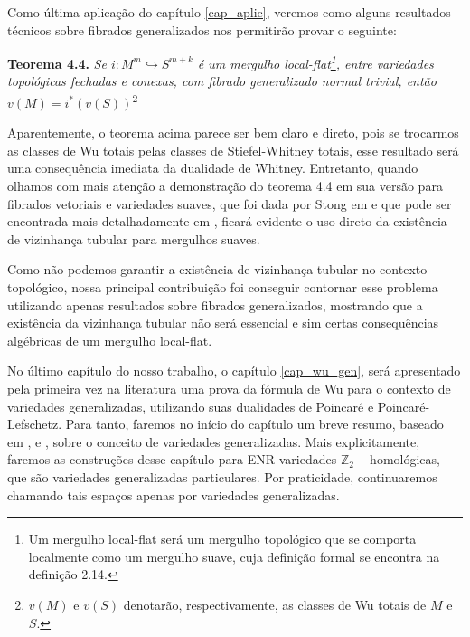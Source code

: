 \documentclass[12pt,oneside]{book} %
\newcommand{\Z}{\mathbb{Z}}
\begin{document}
\par Como última aplicação do capítulo \ref{cap_aplic}, veremos como alguns resultados técnicos sobre fibrados generalizados nos permitirão provar o seguinte:\newline

\par\textbf{Teorema 4.4. }\textit{Se $i:M^{m}\hookrightarrow S^{m+k}$ é um mergulho local-flat\footnote{Um mergulho local-flat será um mergulho topológico que se comporta localmente como um mergulho suave, cuja definição formal se encontra na definição 2.14.}, entre variedades topológicas fechadas e conexas, com fibrado generalizado normal trivial, então $v(M)=i^{*}(v(S))$}\footnote{$v(M)$ e $v(S)$ denotarão, respectivamente, as classes de Wu totais de $M$ e $S$.}\newline

\par Aparentemente, o teorema acima parece ser bem claro e direto, pois se trocarmos as classes de Wu totais pelas classes de Stiefel-Whitney totais, esse resultado será uma consequência imediata da dualidade de Whitney. Entretanto, quando olhamos com mais atenção a demonstração do teorema 4.4 em sua versão para fibrados vetoriais e variedades suaves, que foi dada por Stong em \cite{stong} e que pode ser encontrada mais detalhadamente em \cite{joao}, ficará evidente o uso direto da existência de vizinhança tubular para mergulhos suaves.

\par Como não podemos garantir a existência de vizinhança tubular no contexto topológico, nossa principal contribuição foi conseguir contornar esse problema utilizando apenas resultados sobre fibrados generalizados, mostrando que a existência da vizinhança tubular não será essencial e sim certas consequências algébricas de um mergulho local-flat.

\par No último capítulo do nosso trabalho, o capítulo \ref{cap_wu_gen}, será apresentado pela primeira vez na literatura uma prova da fórmula de Wu para o contexto de variedades generalizadas, utilizando suas dualidades de Poincaré e Poincaré-Lefschetz. Para tanto, faremos no início do capítulo um breve resumo, baseado em \cite{biasi}, \cite{denise} e \cite{bredon_2}, sobre o conceito de variedades generalizadas. Mais explicitamente, faremos as construções desse capítulo para ENR-variedades $\Z_{2}-$homológicas, que são variedades generalizadas particulares. Por praticidade, continuaremos chamando tais espaços apenas por variedades generalizadas.
\end{document}
